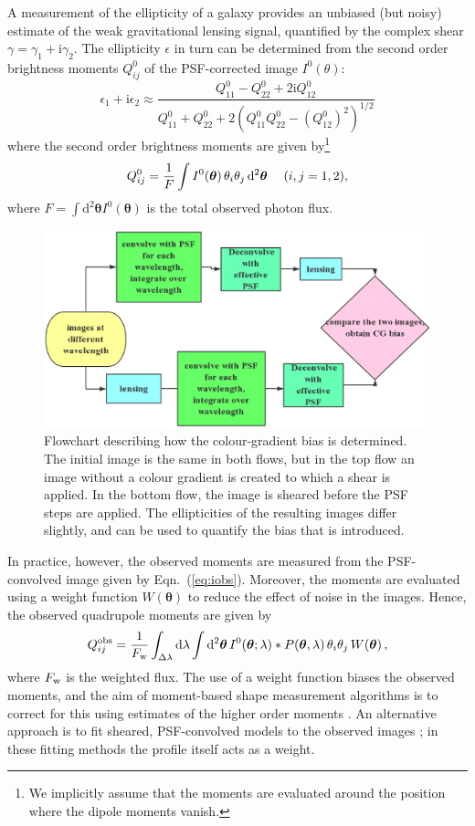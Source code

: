 \documentclass[useAMS,usenatbib]{mnras}
\renewcommand{\d}{\mathrm{d}}
\newcommand{\ii}{\mathrm{i}}
\newcommand{\be}{\begin{equation}}
\newcommand{\ee}{\end{equation}}
\def\elabel#1{\label{eq:#1}}
\begin{document}
A measurement of the ellipticity of a galaxy provides an unbiased (but noisy) estimate of the
weak gravitational lensing signal, quantified by the complex shear $\gamma=\gamma_1+\ii\gamma_2$.
The ellipticity $\epsilon$ in turn can be determined from the second order brightness moments $Q^0_{ij}$ of the PSF-corrected image $I^0(\theta)$:
%
\be
\epsilon_1+\ii \epsilon_2 \approx \frac{Q^0_{11} - Q^0_{22} + 2 \ii Q^0_{12} }
{Q^0_{11} + Q^0_{22} +2(Q^0_{11}Q^0_{22} - (Q^0_{12})^2)^{1/2}}
\elabel{mshear}
\ee
%
where the second order brightness moments are given by\footnote{We implicitly assume that the moments are evaluated around the position where the dipole moments vanish.}
%
\be
Q^0_{ij} = {1 \over F} \int  I^{0}({\bm \theta})\, \theta_i \theta_j \, \d^2 {\bm \theta} \quad\; (i,j=1,2),
\ee
%
where $F=\int \d^2{{\bm\theta}}  I^{0}({\bm\theta})$ is the total observed photon flux.

%
\begin{figure}
\includegraphics[width=12.5cm]{colourg.eps}
\caption{Flowchart describing how the colour-gradient bias is determined. The initial image
is the same in both flows, but in the top flow an image without a colour gradient is created
to which a shear is applied. In the bottom flow, the image is sheared before the PSF steps
are applied. The ellipticities of the resulting images differ slightly, and can be used to quantify
the bias that is introduced.}
\label{fig:flowchart}
\end{figure}
%


In practice, however, the observed moments are measured from the PSF-convolved image given by
Eqn.~(\ref{eq:iobs}). Moreover, the moments are evaluated using a weight function $W({\bm\theta})$  to reduce the effect of noise in the images. Hence, the observed quadrupole moments are given by
\be
Q^{\rm obs}_{ij} = {1 \over F_{\rm w}} \int_{\Delta\lambda} \d\lambda \int \d^2 {\bm\theta} \,
I^0({\bm\theta}; \lambda) *  P({\bm\theta},\lambda)\, \theta_i \theta_j \, W({\bm \theta})\,,
\ee
%
where $F_{\rm w}$ is the weighted flux. The use of a weight function biases the observed moments,
and the aim of moment-based shape measurement algorithms is to correct for this using estimates of the higher order moments \citep[e.g.][]{Kaiser1995,Melchior11}. An alternative approach is to fit sheared, PSF-convolved models to the observed images
\citep[e.g.][]{Bridle02,Miller13}; in these fitting methods the profile itself acts as a weight.
\end{document}
